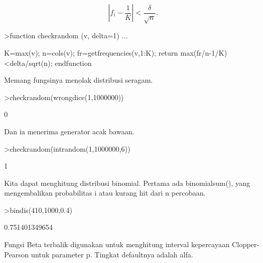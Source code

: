 \documentclass[a4paper,10pt]{article}
\begin{document}
\begin{eulernotebook}
\begin{eulercomment}
\begin{eulercomment}
\begin{eulercomment}
\end{eulercomment}
\begin{eulerformula}
\[
\left|f_i-\frac{1}{K}\right| < \frac{\delta}{\sqrt{n}}.
\]
\end{eulerformula}
\begin{eulerprompt}
>function checkrandom (v, delta=1) ...
\end{eulerprompt}
\begin{eulerudf}
    K=max(v); n=cols(v);
    fr=getfrequencies(v,1:K);
    return max(fr/n-1/K)<delta/sqrt(n);
    endfunction
\end{eulerudf}
\begin{eulercomment}
Memang fungsinya menolak distribusi seragam.
\end{eulercomment}
\begin{eulerprompt}
>checkrandom(wrongdice(1,1000000))
\end{eulerprompt}
\begin{euleroutput}
  0
\end{euleroutput}
\begin{eulercomment}
Dan ia menerima generator acak bawaan.
\end{eulercomment}
\begin{eulerprompt}
>checkrandom(intrandom(1,1000000,6))
\end{eulerprompt}
\begin{euleroutput}
  1
\end{euleroutput}
\begin{eulercomment}
Kita dapat menghitung distribusi binomial. Pertama ada binomialsum(),
yang mengembalikan probabilitas i atau kurang hit dari n percobaan.
\end{eulercomment}
\begin{eulerprompt}
>bindis(410,1000,0.4)
\end{eulerprompt}
\begin{euleroutput}
  0.751401349654
\end{euleroutput}
\begin{eulercomment}
Fungsi Beta terbalik digunakan untuk menghitung interval kepercayaan
Clopper-Pearson untuk parameter p. Tingkat defaultnya adalah alfa.


\end{eulercomment}
\end{eulercomment}
\end{eulercomment}
\end{eulernotebook}
\end{document}
